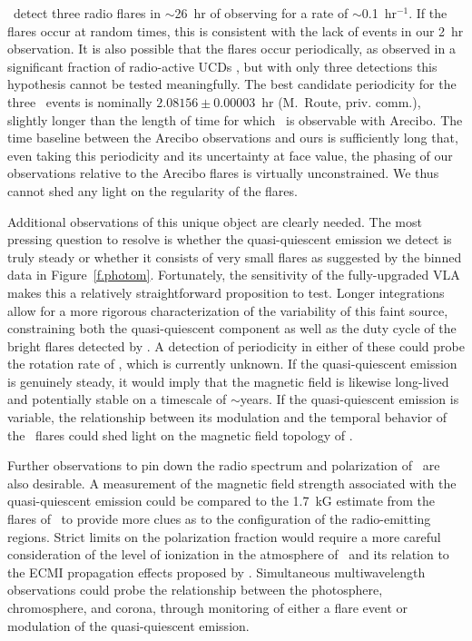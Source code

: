 \documentclass[iop]{emulateapj}
\newcommand\citeeg[1]{\citep[e.g.,][]{#1}}
\newcommand\vtwom{2M\,1047+21} %
\newcommand\twom{\object{\vtwom}}
\newcommand\apx{\ensuremath{\sim}}
\newcommand\ha{H$\alpha$}
\begin{document}
\rw\ detect three radio flares in \apx26~hr of observing for a rate of
\apx0.1~hr$^{-1}$. If the flares occur at random times, this is consistent
with the lack of events in our 2~hr observation. It is also possible that the
flares occur periodically, as observed in a significant fraction of
radio-active UCDs \citeeg{brr+05,brpb+09,hbl+07,had+08}, but with only three
detections this hypothesis cannot be tested meaningfully. The best candidate
periodicity for the three \rw\ events is nominally $2.08156 \pm 0.00003$~hr
(M.~Route, priv. comm.), slightly longer than the length of time for which
\twom\ is observable with Arecibo. The time baseline between the Arecibo
observations and ours is sufficiently long that, even taking this periodicity
and its uncertainty at face value, the phasing of our observations relative to
the Arecibo flares is virtually unconstrained. We thus cannot shed any light
on the regularity of the flares.

Additional observations of this unique object are clearly needed. The most
pressing question to resolve is whether the quasi-quiescent emission we detect
is truly steady or whether it consists of very small flares as suggested by
the binned data in Figure~\ref{f.photom}. Fortunately, the sensitivity of the
fully-upgraded VLA makes this a relatively straightforward proposition to
test. Longer integrations allow for a more rigorous characterization of the
variability of this faint source, constraining both the quasi-quiescent
component as well as the duty cycle of the bright flares detected by \rw. A
detection of periodicity in either of these could probe the rotation rate of
\twom, which is currently unknown. If the quasi-quiescent emission is
genuinely steady, it would imply that the magnetic field is likewise
long-lived and potentially stable on a timescale of \apx years. If the
quasi-quiescent emission is variable, the relationship between its modulation
and the temporal behavior of the \rw\ flares could shed light on the magnetic
field topology of \twom.

Further observations to pin down the radio spectrum and polarization of
\twom\ are also desirable. A measurement of the magnetic field strength
associated with the quasi-quiescent emission could be compared to the 1.7~kG
estimate from the flares of \rw\ to provide more clues as to the configuration
of the radio-emitting regions. Strict limits on the polarization fraction
would require a more careful consideration of the level of ionization in the
atmosphere of \twom\ and its relation to the ECMI propagation effects proposed
by \citet{had+08}. Simultaneous multiwavelength observations \citep[radio,
  \ha, optical broadband, X-rays; e.g.][]{bgg+08,bbf+10} could probe the
relationship between the photosphere, chromosphere, and corona, through
monitoring of either a flare event or modulation of the quasi-quiescent
emission.
\end{document}
